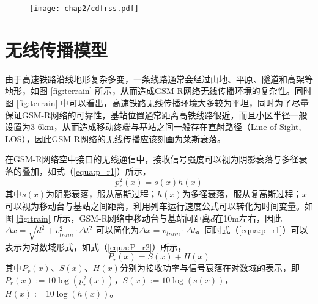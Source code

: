 \begin{figure}[!htp]
\centering
    \label{}
    \texttt{[image: chap2/cdfrss.pdf]}
\end{figure}


\section{无线传播模型}
\label{sec:channelmodel}

由于高速铁路沿线地形复杂多变，一条线路通常会经过山地、平原、隧道和高架等地形，如图 \ref{fig:terrain} 所示，从而造成GSM-R网络无线传播环境的复杂性。同时图 \ref{fig:terrain} 中可以看出，高速铁路无线传播环境大多较为平坦，同时为了尽量保证GSM-R网络的可靠性，基站位置通常距离高铁线路很近，而且小区半径一般设置为3-6km，从而造成移动终端与基站之间一般存在直射路径（Line of Sight, LOS），因此GSM-R网络的无线传播应该刻画为莱斯衰落。

\begin{figure}[!htp]
\centering
{}
    \hspace{1cm}
\hspace{1in}
\centering
{}
    \hspace{1cm}
\end{figure}

在GSM-R网络空中接口的无线通信中，接收信号强度可以视为阴影衰落与多径衰落的叠加，如式（\ref{equa:p_r1}）所示，
\begin{equation}
    p_{r}^{2}(x) = s(x)h(x)
\label{equa:p_r1}
\end{equation}
其中$s(x)$为阴影衰落，服从高斯过程；$h(x)$为多径衰落，服从复高斯过程；$x$可以视为移动台与基站之间距离，利用列车运行速度公式可以转化为时间变量。如图 \ref{fig:train} 所示，GSM-R网络中移动台与基站间距离$d$在10m左右，因此$\Delta x=\sqrt{d^2+v_{train}^2\cdot \Delta t^2}$ 可以简化为$\Delta x=v_{train}\cdot \Delta t$。同时式（\ref{equa:p_r1}）可以表示为对数域形式，如式（\ref{equa:P_r2}）所示，
\begin{equation}
P_{r}(x) = S(x) + H(x)
\label{equa:P_r2}
\end{equation}
其中$P_r(x)$、$S(x)$、$H(x)$分别为接收功率与信号衰落在对数域的表示，即$P_r(x):=10\log(p_{r}^{2}(x))$，$S(x):=10\log(s(x))$，$H(x):=10\log(h(x))$。

